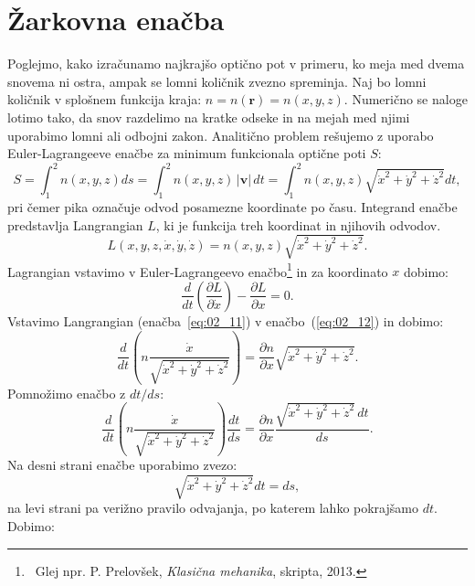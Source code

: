 \section{Žarkovna enačba}
Poglejmo, kako izračunamo najkrajšo optično pot v primeru, ko 
meja med dvema snovema ni ostra, ampak se lomni količnik zvezno spreminja. 
Naj bo lomni količnik v splošnem funkcija kraja: $n = n(\mathbf{r}) = n(x,y,z)$.
Numerično se naloge lotimo tako, da snov razdelimo
na kratke odseke in na mejah med njimi uporabimo lomni ali odbojni zakon.
Analitično problem rešujemo z uporabo Euler-Lagrangeeve enačbe za minimum
funkcionala optične poti $S$:
\begin{equation}
 S = \int_1^2 n(x,y,z) ds  = \int_1^2 n(x,y,z)\,|\mathbf{v}|\,dt  = 
 \int_1^2 n(x,y,z) \sqrt{\dot{x}^2+ \dot{y}^2+\dot{z}^2} dt,
 \label{eq:02_10}
\end{equation}
pri čemer pika označuje odvod posamezne koordinate po času. Integrand
enačbe predstavlja Langrangian $L$, ki je funkcija treh koordinat in njihovih
odvodov.
\begin{equation}
L(x, y, z, \dot{x}, \dot{y}, \dot{z}) = n(x,y,z) \sqrt{\dot{x}^2+ \dot{y}^2+\dot{z}^2}.
\label{eq:02_11}
\end{equation}
Lagrangian vstavimo v Euler-Lagrangeevo enačbo\footnote{~Glej npr. P. Prelovšek, {\it Klasična
mehanika}, skripta, 2013.} in za koordinato $x$ dobimo:
\begin{equation}
 \frac{d}{dt}\left(\frac{\partial L}{\partial \dot{x}}\right) - 
 \frac{\partial L}{\partial x} = 0.
 \label{eq:02_12}
\end{equation}
Vstavimo Langrangian (enačba~\ref{eq:02_11}) 
v enačbo~(\ref{eq:02_12}) in dobimo:
\begin{equation}
\frac{d}{dt}\left(n \frac{\dot{x}}{\sqrt{\dot{x}^2+ \dot{y}^2+\dot{z}^2}} \right)
 = \frac{\partial n}{\partial x}\sqrt{\dot{x}^2+ \dot{y}^2+\dot{z}^2}.
  \label{eq:02_13}
\end{equation}
Pomnožimo enačbo z $dt/ds$:
\begin{equation}
\frac{d}{dt}\left(n \frac{\dot{x}}{\sqrt{\dot{x}^2+ \dot{y}^2+\dot{z}^2}} \right)
\frac{dt}{ds}
 = \frac{\partial n}{\partial x}\frac{\sqrt{\dot{x}^2+ \dot{y}^2+\dot{z}^2}\,dt}{ds}.
  \label{eq:02_14}
\end{equation}
Na desni strani enačbe uporabimo zvezo:
\begin{equation}
 \sqrt{\dot{x}^2+ \dot{y}^2+\dot{z}^2} dt = ds,
 \label{eq:02_15}
\end{equation}
na levi strani pa verižno pravilo odvajanja, po katerem lahko pokrajšamo $dt$. Dobimo:
